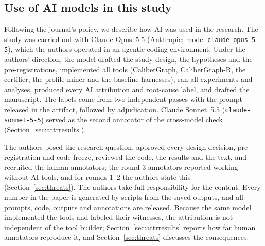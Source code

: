 \subsection{Use of AI models in this study}\label{sec:aiuse}
Following the journal's policy, we describe how AI was used in the research. The study was carried out with Claude Opus~5.5 (Anthropic; model \texttt{claude-opus-5-5}), which the authors operated in an agentic coding environment. Under the authors' direction, the model drafted the study design, the hypotheses and the pre-registrations, implemented all tools (CaliberGraph, CaliberGraph-R, the certifier, the profile miner and the baseline harnesses), ran all experiments and analyses, produced every AI attribution and root-cause label, and drafted the manuscript. The labels come from two independent passes with the prompt released in the artifact, followed by adjudication. Claude Sonnet~5.5 (\texttt{claude-sonnet-5-5}) served as the second annotator of the cross-model check (Section~\ref{sec:attrresults}).

The authors posed the research question, approved every design decision, pre-registration and code freeze, reviewed the code, the results and the text, and recruited the human annotators; the round-3 annotators reported working without AI tools, and for rounds 1--2 the authors state this (Section~\ref{sec:threats}). The authors take full responsibility for the content. Every number in the paper is generated by scripts from the saved outputs, and all prompts, code, outputs and annotations are released. Because the same model implemented the tools and labeled their witnesses, the attribution is not independent of the tool builder; Section~\ref{sec:attrresults} reports how far human annotators reproduce it, and Section~\ref{sec:threats} discusses the consequences.
